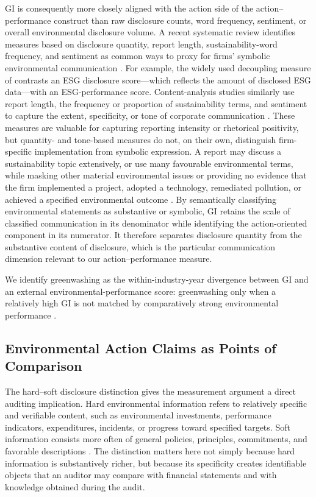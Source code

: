 \documentclass[11pt]{article}
\begin{document}
GI is consequently more closely aligned with the action side of the action--performance construct than raw disclosure counts, word frequency, sentiment, or overall environmental disclosure volume. A recent systematic review identifies measures based on disclosure quantity, report length, sustainability-word frequency, and sentiment as common ways to proxy for firms' symbolic environmental communication \citep{lubloy2025quantifying}. For example, the widely used decoupling measure of \citet{yu2020greenwashing} contrasts an ESG disclosure score---which reflects the amount of disclosed ESG data---with an ESG-performance score. Content-analysis studies similarly use report length, the frequency or proportion of sustainability terms, and sentiment to capture the extent, specificity, or tone of corporate communication \citep{grewal2022unrepresentative,walker2012harm,baier2020textual,bilinski2024usefulness}. 
These measures are valuable for capturing reporting intensity or rhetorical positivity, but quantity- and tone-based measures do not, on their own, distinguish firm-specific implementation from symbolic expression. A report may discuss a sustainability topic extensively, or use many favourable environmental terms, while masking other material environmental issues or providing no evidence that the firm implemented a project, adopted a technology, remediated pollution, or achieved a specified environmental outcome \citep{lubloy2025quantifying,clarkson2008revisiting,hummel2016relationship,xu2026deepgreen}. By semantically classifying environmental statements as substantive or symbolic, GI retains the scale of classified communication in its denominator while identifying the action-oriented component in its numerator. It therefore separates disclosure quantity from the substantive content of disclosure, which is the particular communication dimension relevant to our action--performance measure.

We identify greenwashing as the within-industry-year divergence between GI and an external environmental-performance score: greenwashing only when a relatively high GI is not matched by comparatively strong environmental performance \citep{delmas2011drivers,lyon2011greenwash,lubloy2025quantifying,xu2026deepgreen}.

\subsection{Environmental Action Claims as Points of Comparison}

The hard--soft disclosure distinction gives the measurement argument a direct auditing implication. 
Hard environmental information refers to relatively specific and verifiable content, such as environmental investments, performance indicators, expenditures, incidents, or progress toward specified targets. 
Soft information consists more often of general policies, principles, commitments, and favorable descriptions \citep{clarkson2008revisiting,hummel2016relationship}. 
The distinction matters here not simply because hard information is substantively richer, but because its specificity creates identifiable objects that an auditor may compare with financial statements and with knowledge obtained during the audit.
\end{document}
